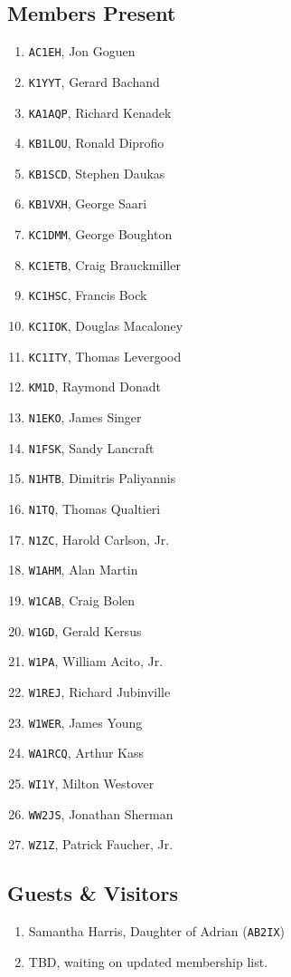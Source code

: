 \documentclass[10pt,letterpaper]{article}
\begin{document}
\subsection{Members Present}
\begin{enumerate}
\item \texttt{AC1EH}, Jon Goguen
\item \texttt{K1YYT}, Gerard Bachand
\item \texttt{KA1AQP}, Richard Kenadek
\item \texttt{KB1LOU}, Ronald Diprofio
\item \texttt{KB1SCD}, Stephen Daukas
\item \texttt{KB1VXH}, George Saari
\item \texttt{KC1DMM}, George Boughton
\item \texttt{KC1ETB}, Craig Brauckmiller
\item \texttt{KC1HSC}, Francis Bock
\item \texttt{KC1IOK}, Douglas Macaloney
\item \texttt{KC1ITY}, Thomas Levergood
\item \texttt{KM1D}, Raymond Donadt
\item \texttt{N1EKO}, James Singer
\item \texttt{N1FSK}, Sandy Lancraft
\item \texttt{N1HTB}, Dimitris Paliyannis
\item \texttt{N1TQ}, Thomas Qualtieri
\item \texttt{N1ZC}, Harold Carlson, Jr.
\item \texttt{W1AHM}, Alan Martin
\item \texttt{W1CAB}, Craig Bolen
\item \texttt{W1GD}, Gerald Kersus
\item \texttt{W1PA}, William Acito, Jr.
\item \texttt{W1REJ}, Richard Jubinville
\item \texttt{W1WER}, James Young
\item \texttt{WA1RCQ}, Arthur Kass
\item \texttt{WI1Y}, Milton Westover
\item \texttt{WW2JS}, Jonathan Sherman
\item \texttt{WZ1Z}, Patrick Faucher, Jr.
\end{enumerate}

\subsection{Guests \& Visitors}
\begin{enumerate}
\item Samantha Harris, Daughter of Adrian (\texttt{AB2IX})
\item TBD, waiting on updated membership list.
\end{enumerate}
\end{document}
